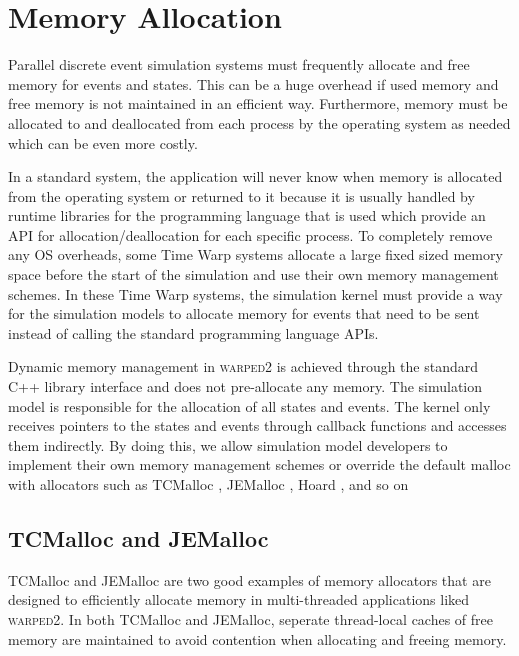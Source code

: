 \documentclass[11pt]{book}
\begin{document}
\section{Memory Allocation}

Parallel discrete event simulation systems must frequently allocate and free memory for events and
states.  This can be a huge overhead if used memory and free memory is not maintained in an
efficient way.  Furthermore, memory must be allocated to and deallocated from each process by the
operating system as needed which can be even more costly.

In a standard system, the application will never know when memory is allocated from the operating
system or returned to it because it is usually handled by runtime libraries for the programming
language that is used which provide an API for allocation/deallocation for each specific
process.  To completely remove any OS overheads, some Time Warp systems allocate a large fixed
sized memory space before the start of the simulation and use their own memory management
schemes.  In these Time Warp systems, the simulation kernel must provide a way for the simulation
models to allocate memory for events that need to be sent instead of calling the standard programming
language APIs.


Dynamic memory management in \textsc{warped2} is achieved through the standard C++ library
interface and does not pre-allocate any memory.  The simulation model is responsible for the
allocation of all states and events.  The kernel only receives pointers to the states and events
through callback functions and accesses them indirectly.  By doing this, we allow simulation model
developers to implement their own memory management schemes or override the default malloc with
allocators such as TCMalloc \cite{}, JEMalloc \cite{}, Hoard \cite{}, and so on

\subsection{TCMalloc and JEMalloc}


TCMalloc \cite{} and JEMalloc \cite{} are two good examples of memory allocators that are designed
to efficiently allocate memory in multi-threaded applications liked \textsc{warped2}.  In both
TCMalloc and JEMalloc, seperate thread-local caches of free memory are maintained to avoid
contention when allocating and freeing memory.
\end{document}
